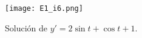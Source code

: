 \begin{figure}[!hbt]
\centering
  \texttt{[image: E1\_i6.png]}
	\caption{Solución de $y'= 2\sin{t}+\cos{t}+1$.}%
	\label{fig:e1i6}
\end{figure}
